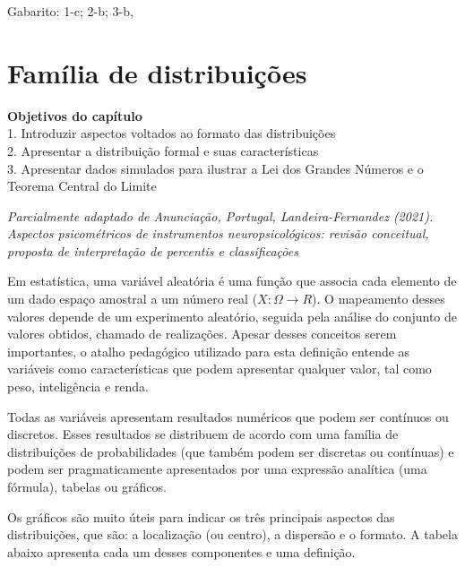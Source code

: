 \documentclass[
]{book}
\newenvironment{objectives}{
  \definecolor{shadecolor}{rgb}{0, 0, 0}  %
  \color{white}
  \begin{shaded}}
 {\end{shaded}}
\newenvironment{mirror}{
  \definecolor{shadecolor}{rgb}{0, 0, 0}  %
  \color{white}
  \begin{shaded}}
 {\end{shaded}}
\begin{document}
\begin{mirror}

Gabarito: 1-c; 2-b; 3-b,

\end{mirror}

\hypertarget{famuxedlia-de-distribuiuxe7uxf5es}{%
\chapter{Família de distribuições}\label{famuxedlia-de-distribuiuxe7uxf5es}}

\begin{objectives}

\textbf{Objetivos do capítulo}\\
1. Introduzir aspectos voltados ao formato das distribuições\\
2. Apresentar a distribuição formal e suas características\\
3. Apresentar dados simulados para ilustrar a Lei dos Grandes Números e o Teorema Central do Limite

\end{objectives}

\emph{Parcialmente adaptado de Anunciação, Portugal, Landeira-Fernandez (2021). Aspectos psicométricos de instrumentos neuropsicológicos: revisão conceitual, proposta de interpretação de percentis e classificações }

Em estatística, uma variável aleatória é uma função que associa cada elemento de um dado espaço amostral a um número real (\(X:\Omega \rightarrow R\)). O mapeamento desses valores depende de um experimento aleatório, seguida pela análise do conjunto de valores obtidos, chamado de realizações. Apesar desses conceitos serem importantes, o atalho pedagógico utilizado para esta definição entende as variáveis como características que podem apresentar qualquer valor, tal como peso, inteligência e renda.

Todas as variáveis apresentam resultados numéricos que podem ser contínuos ou discretos. Esses resultados se distribuem de acordo com uma família de distribuições de probabilidades (que também podem ser discretas ou contínuas) e podem ser pragmaticamente apresentados por uma expressão analítica (uma fórmula), tabelas ou gráficos.

Os gráficos são muito úteis para indicar os três principais aspectos das distribuições, que são: a localização (ou centro), a dispersão e o formato. A tabela abaixo apresenta cada um desses componentes e uma definição.
\end{document}
